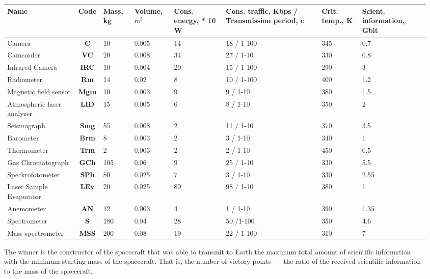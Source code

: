 \documentclass[12pt,a4paper]{article}
\begin{document}
\begin{center}
\begin{longtable}{ |p{3cm}|c|p{1.5cm}|p{1.5cm}|p{1.5cm}|p{2cm}|p{1.5cm}|p{1.5cm}| }
  \hline
 \textbf{Name} & \textbf{Code} & \textbf{Mass, kg} & \textbf{Volume, $\text{m}^3$} &
   \textbf{Cons. energy, * 10 W} & \textbf{Cons. traffic, Kbps / Transmission period,
     c} & \textbf{Crit. temp., K} & \textbf{Scient. information, Gbit}\\
   \hline
   \endhead
   Camera & \textbf{C} & 10 & 0.005 & 14 & 18 / 1-100 & 345 & 0.7\\
   \hline
   Camcorder & \textbf{VC} & 20 & 0.008 & 34 & 27 / 1-10 & 330 & 0.8\\
   \hline
   Infrared Camera & \textbf{IRC} & 10 & 0.004 & 20 & 15 / 1-100 & 290 & 3\\
   \hline
   Radiometer & \textbf{Rm} & 14 & 0.02 & 8 & 10 / 1-100 & 400 & 1.2\\
   \hline
   Magnetic field sensor & \textbf{Mgm} & 10 & 0.003 & 9 & 9 / 1-10 & 380 & 1.5\\
   \hline
   Atmospheric laser analyzer & \textbf{LID} & 15 & 0.005 & 6 & 8 / 1-10 & 350 &
   2\\
   \hline
   Seismograph & \textbf{Smg} & 55 & 0.008 & 2 & 11 / 1-10 & 370 & 3.5\\
   \hline
   Barometer & \textbf{Brm} & 8 & 0.003 & 2 & 3 / 1-10 & 340 & 1\\
   \hline
   Thermometer & \textbf{Trm} & 2 & 0.003 & 2 & 2 / 1-10 & 450 & 0.5\\
   \hline
   Gas Chromatograph & \textbf{GCh} & 105 & 0.06 & 9 & 25 / 1-10 & 330 & 5.5\\
   \hline
   Speck\-ro\-fo\-to\-meter & \textbf{SPh} & 80 & 0.025 & 7 & 3 / 1-10 & 330 & 2.55\\
   \hline
   Laser Sample Evaporator & \textbf{LEv} & 20 & 0.025 & 80 & 98 / 1-10 & 380 & 1\\
   \hline
   Anemometer & \textbf{AN} & 12 & 0.003 & 4 & 1 / 1-10 & 390 & 1.35 \\
   \hline
   Spectrometer & \textbf{S} & 180 & 0.04 & 28 & 50 /1-100 & 350 & 4.6\\
   \hline
   Mass spectrometer & \textbf{MSS} & 200 & 0.08 & 19 & 22 / 1-100 & 310 & 7\\
   \hline
\end{longtable}
\end{center}

The winner is the constructor of the spacecraft that was able to transmit to Earth the maximum total amount of scientific information with the minimum starting mass of the spacecraft. That is, the number of victory points~--- the ratio of the received scientific information to the mass of the spacecraft.
\end{document}
